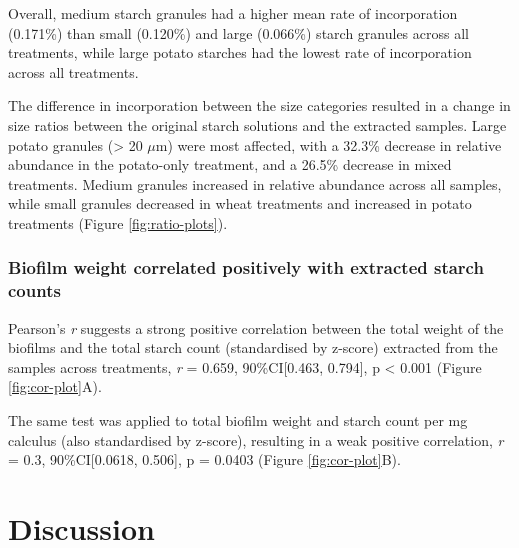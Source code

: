 \documentclass[utf8]{../templates/frontiersSCNS}
\begin{document}
Overall, medium starch granules had a higher mean rate of incorporation
(0.171\%)
than small
(0.120\%)
and large
(0.066\%)
starch granules across all treatments, while large potato starches had the lowest
rate of incorporation across all treatments.

The difference in incorporation between the size categories resulted in a change
in size ratios between the original starch solutions and the extracted samples.
Large potato granules (\textgreater{} 20 \(\mu\)m) were most affected, with a
32.3\%
decrease in relative abundance in the potato-only treatment, and a
26.5\%
decrease in mixed treatments. Medium granules increased in relative abundance
across all samples, while small granules decreased in wheat treatments and
increased in potato treatments
(Figure \ref{fig:ratio-plots}).

\hypertarget{biofilm-weight-correlated-positively-with-extracted-starch-counts}{%
\subsubsection{Biofilm weight correlated positively with extracted starch counts}\label{biofilm-weight-correlated-positively-with-extracted-starch-counts}}

Pearson's \emph{r} suggests a
strong positive
correlation between the total weight of the biofilms and the total starch count
(standardised by z-score) extracted from the samples across treatments,
\emph{r} = 0.659,
90\%CI{[}0.463, 0.794{]},
p \textless{} 0.001
(Figure \ref{fig:cor-plot}A).

The same test was applied to total biofilm weight and starch count per mg
calculus (also standardised by z-score), resulting in a weak positive correlation,
\emph{r} = 0.3,
90\%CI{[}0.0618, 0.506{]},
p = 0.0403
(Figure \ref{fig:cor-plot}B).

\hypertarget{discussion}{%
\section{Discussion}\label{discussion}}
\end{document}

